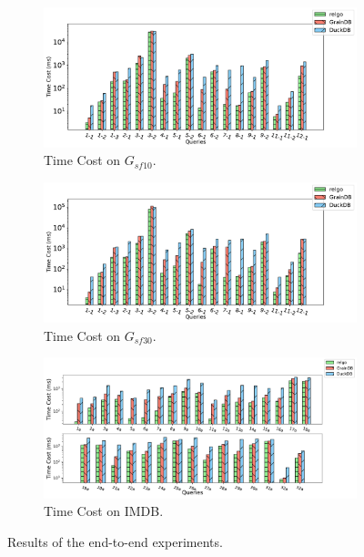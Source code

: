 \begin{figure}[ht]
    \centering
    \begin{subfigure}[b]{0.45\linewidth}
        \centering
        \includegraphics[width=\linewidth]{./figures/exp/e2e_sf10.pdf}
        \caption{Time Cost on $G_{sf10}$.}
        \label{fig:exp-e2e-sf10}
    \end{subfigure}
    \begin{subfigure}[b]{0.45\linewidth}
        \centering
        \includegraphics[width=\linewidth]{./figures/exp/e2e_sf30.pdf}
        \caption{Time Cost on $G_{sf30}$.}
        \label{fig:exp-e2e-sf30}
    \end{subfigure}
    \begin{subfigure}[b]{0.6\linewidth}
        \centering
        \includegraphics[width=\linewidth]{./figures/exp/e2e_job.pdf}
        \caption{Time Cost on IMDB.}
        \label{fig:exp-e2e-job}
    \end{subfigure}
    \caption{Results of the end-to-end experiments.}
    \label{fig:exp-e2e}
\end{figure}

